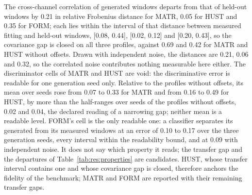 \documentclass{article}
\begin{document}
The cross-channel correlation of generated windows departs from that of held-out windows by 0.21 in relative Frobenius distance for MATR, 0.05 for HUST and 0.35 for FORM; each lies within the interval of that distance between measured fitting and held-out windows, [0.08, 0.44], [0.02, 0.12] and [0.20, 0.43], so the covariance gap is closed on all three profiles, against 0.69 and 0.42 for MATR and HUST without offsets. Drawn with independent noise, the distances are 0.21, 0.06 and 0.32, so the correlated noise contributes nothing measurable here either. The discriminator cells of MATR and HUST are void: the discriminative error is readable for one generation seed only. Relative to the profiles without offsets, its mean over seeds rose from 0.07 to 0.33 for MATR and from 0.16 to 0.49 for HUST, by more than the half-ranges over seeds of the profiles without offsets, 0.02 and 0.04, the declared reading of a narrowing gap; neither mean is a readable level. FORM's cell is the only readable one: a classifier separates its generated from its measured windows at an error of 0.10 to 0.17 over the three generation seeds, every interval within the readability bound, and at 0.09 with independent noise. It does not say which property it reads; the transfer gap and the departures of Table~\ref{tab:res:properties} are candidates. HUST, whose transfer interval contains one and whose covariance gap is closed, therefore anchors the fidelity of the benchmark; MATR and FORM are reported with their remaining transfer gaps.
\end{document}

